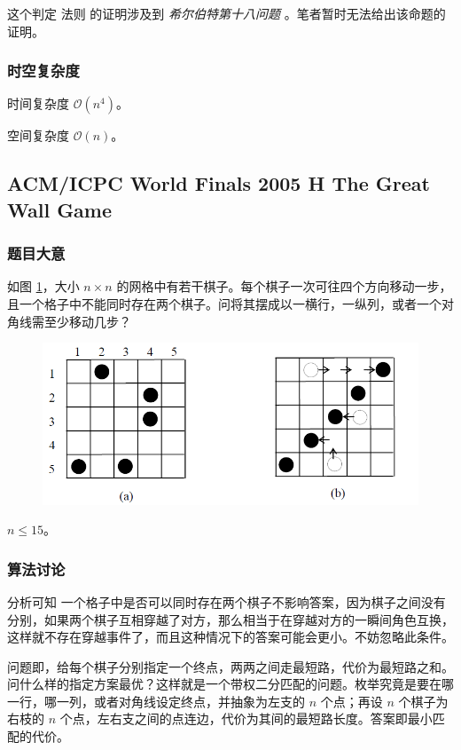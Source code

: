 				这个判定
				法则
				的证明涉及到 \emph{希尔伯特第十八问题} 。笔者暂时无法给出该命题的证明。
			\subsubsection{时空复杂度}
				时间复杂度 $\mathcal{O}\left(n^4 \right)$。
					
				空间复杂度 $\mathcal{O}\left(n\right)$。


\newpage
		\subsection{ACM/ICPC World Finals 2005 H The Great Wall Game}
			\subsubsection{题目大意}

				如图 \ref{2005h}，大小 $n \times n$ 的网格中有若干棋子。每个棋子一次可往四个方向移动一步，且一个格子中不能同时存在两个棋子。问将其摆成以一横行，一纵列，或者一个对角线需至少移动几步？
				
				\begin{figure}[htb]
					\centering
					\includegraphics[width=0.7 \textwidth]{2005h.png}
					\caption{} \label{2005h}
				\end{figure}
				
				$n \le 15$。
			\subsubsection{算法讨论}
				分析可知 一个格子中是否可以同时存在两个棋子不影响答案，因为棋子之间没有分别，如果两个棋子互相穿越了对方，那么相当于在穿越对方的一瞬间角色互换，这样就不存在穿越事件了，而且这种情况下的答案可能会更小。不妨忽略此条件。
				
				问题即，给每个棋子分别指定一个终点，两两之间走最短路，代价为最短路之和。问什么样的指定方案最优？这样就是一个带权二分匹配的问题。枚举究竟是要在哪一行，哪一列，或者对角线设定终点，并抽象为左支的 $n$ 个点；再设 $n$ 个棋子为右枝的 $n$ 个点，左右支之间的点连边，代价为其间的最短路长度。答案即最小匹配的代价。
